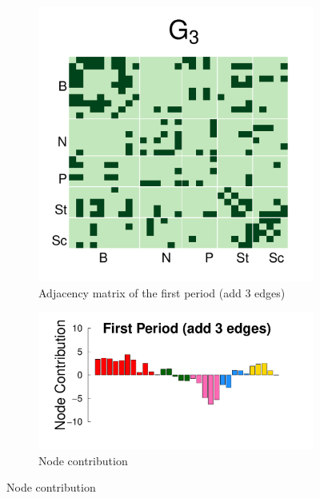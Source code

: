 \documentclass[12pt]{article}
\begin{document}
\begin{figure}[H]
	\centering
	\begin{subfigure}[b]{0.3\textwidth}
		\includegraphics[width=\textwidth]{../../Figure/sim_Adj3.pdf}
		\caption{Adjacency matrix of the first period (add 3 edges)}
		\label{fig:step3}
	\end{subfigure}
	\begin{subfigure}[b]{0.6\textwidth}
		\includegraphics[width=\textwidth]{../../Figure/step3.pdf}
		\caption{Node contribution}
		\label{fig:adj.step3}
	\end{subfigure}
\end{figure}
\end{document}
